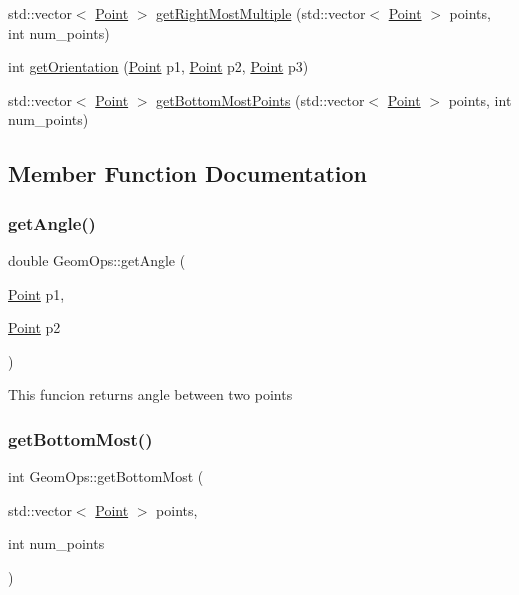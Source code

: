 \begin{DoxyCompactItemize}
\item 
std\+::vector$<$ \hyperlink{classPoint}{Point} $>$ \hyperlink{classGeomOps_a0c5f866d03e800a01d424fa9317a6c49}{get\+Right\+Most\+Multiple} (std\+::vector$<$ \hyperlink{classPoint}{Point} $>$ points, int num\+\_\+points)
\item 
int \hyperlink{classGeomOps_af0c9873799ec28ec6a4196c181bc5942}{get\+Orientation} (\hyperlink{classPoint}{Point} p1, \hyperlink{classPoint}{Point} p2, \hyperlink{classPoint}{Point} p3)
\item 
std\+::vector$<$ \hyperlink{classPoint}{Point} $>$ \hyperlink{classGeomOps_acbab4d3b33a391c1169fedec1531212a}{get\+Bottom\+Most\+Points} (std\+::vector$<$ \hyperlink{classPoint}{Point} $>$ points, int num\+\_\+points)
\end{DoxyCompactItemize}


\subsection{Member Function Documentation}
\mbox{\label{classGeomOps_aa043ea44a94e23c17ee6aa56d71ac1ef}} 
\subsubsection{\texorpdfstring{get\+Angle()}{getAngle()}}
{\footnotesize\ttfamily double Geom\+Ops\+::get\+Angle (\begin{DoxyParamCaption}\item[{\hyperlink{classPoint}{Point}}]{p1,  }\item[{\hyperlink{classPoint}{Point}}]{p2 }\end{DoxyParamCaption})}

This funcion returns angle between two points \mbox{\label{classGeomOps_a64f2985b274cb5055d838e4011a59345}} 
\subsubsection{\texorpdfstring{get\+Bottom\+Most()}{getBottomMost()}}
{\footnotesize\ttfamily int Geom\+Ops\+::get\+Bottom\+Most (\begin{DoxyParamCaption}\item[{std\+::vector$<$ \hyperlink{classPoint}{Point} $>$}]{points,  }\item[{int}]{num\+\_\+points }\end{DoxyParamCaption})}

